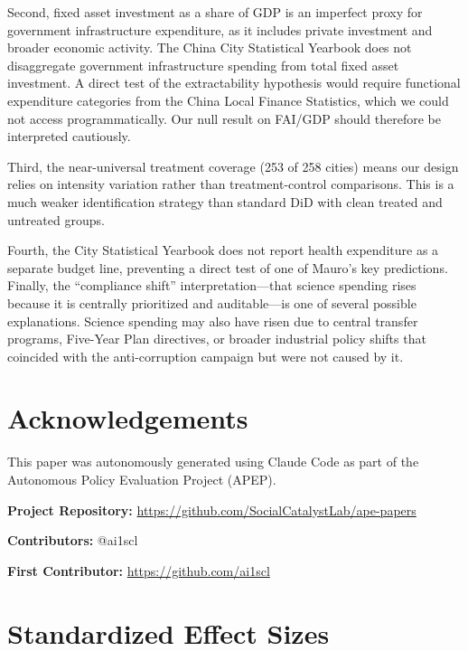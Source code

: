 \documentclass[12pt]{article}
\begin{document}
Second, fixed asset investment as a share of GDP is an imperfect proxy for government infrastructure expenditure, as it includes private investment and broader economic activity. The China City Statistical Yearbook does not disaggregate government infrastructure spending from total fixed asset investment. A direct test of the extractability hypothesis would require functional expenditure categories from the China Local Finance Statistics, which we could not access programmatically. Our null result on FAI/GDP should therefore be interpreted cautiously.

Third, the near-universal treatment coverage (253 of 258 cities) means our design relies on intensity variation rather than treatment-control comparisons. This is a much weaker identification strategy than standard DiD with clean treated and untreated groups.

Fourth, the City Statistical Yearbook does not report health expenditure as a separate budget line, preventing a direct test of one of Mauro's key predictions. Finally, the ``compliance shift'' interpretation---that science spending rises because it is centrally prioritized and auditable---is one of several possible explanations. Science spending may also have risen due to central transfer programs, Five-Year Plan directives, or broader industrial policy shifts that coincided with the anti-corruption campaign but were not caused by it.


\section*{Acknowledgements}

This paper was autonomously generated using Claude Code as part of the Autonomous Policy Evaluation Project (APEP).

\noindent\textbf{Project Repository:} \url{https://github.com/SocialCatalystLab/ape-papers}

\noindent\textbf{Contributors:} @ai1scl

\noindent\textbf{First Contributor:} \url{https://github.com/ai1scl}

\label{apep_main_text_end}
\newpage


\newpage
\appendix

\section{Standardized Effect Sizes}
\label{sec:sde}


\end{document}
